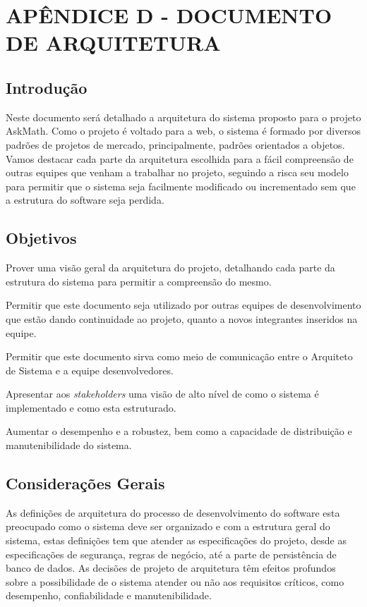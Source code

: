 \chapter*{APÊNDICE D - DOCUMENTO DE ARQUITETURA}\label{apendice_arquitetura}


\section{Introdução}
Neste documento será detalhado a arquitetura do sistema proposto para o projeto 
AskMath. Como o projeto é voltado para a web, o sistema é formado por diversos 
padrões de projetos de mercado, principalmente, padrões orientados a objetos. 
Vamos destacar cada parte da arquitetura escolhida para a fácil compreensão de 
outras equipes que venham a trabalhar no projeto, seguindo a risca seu modelo 
para permitir que o sistema seja facilmente modificado ou incrementado sem que a 
estrutura do software seja perdida.

\section{Objetivos}
\begin{alineascomponto}
	\item Prover uma visão geral da arquitetura do projeto, detalhando cada 
parte da estrutura do sistema para permitir a compreensão do mesmo.
    \item Permitir que este documento seja utilizado por outras equipes de 
desenvolvimento que estão dando continuidade ao projeto, quanto a novos 
integrantes inseridos na equipe.
    \item Permitir que este documento sirva como meio de comunicação entre o 
Arquiteto de Sistema e a equipe desenvolvedores.
    \item Apresentar aos \textit{stakeholders} uma visão de alto nível de como o 
sistema é implementado e como esta estruturado.
    \item Aumentar o desempenho e a robustez, bem como a capacidade de 
distribuição e manutenibilidade do sistema.
\end{alineascomponto}

\section{Considerações Gerais}
As definições de arquitetura do processo de desenvolvimento do software esta 
preocupado como o sistema deve ser organizado e com a estrutura geral do 
sistema, estas definições tem que atender as especificações do projeto, desde as 
especificações de segurança, regras de negócio, até a parte de persistência de 
banco de dados. As decisões de projeto de arquitetura têm efeitos profundos 
sobre a possibilidade de o sistema atender ou não aos requisitos críticos, como 
desempenho, confiabilidade e manutenibilidade.

